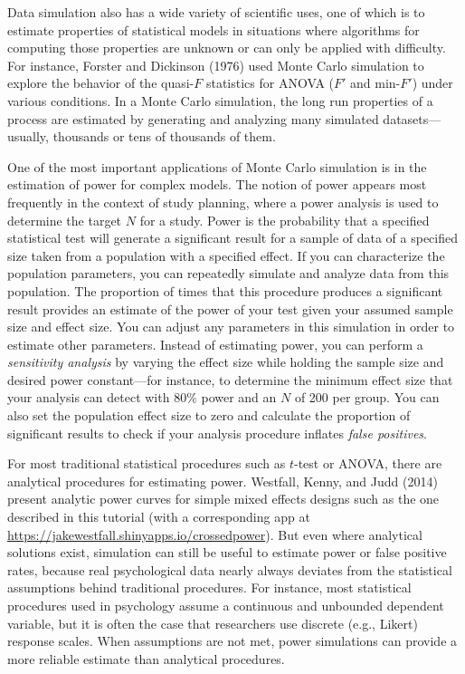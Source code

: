 \documentclass[
  english,
  doc,floatsintext]{apa6}
\begin{document}
Data simulation also has a wide variety of scientific uses, one of which is to estimate properties of statistical models in situations where algorithms for computing those properties are unknown or can only be applied with difficulty. For instance, Forster and Dickinson (1976) used Monte Carlo simulation to explore the behavior of the quasi-\(F\) statistics for ANOVA (\(F'\) and min-\(F'\)) under various conditions. In a Monte Carlo simulation, the long run properties of a process are estimated by generating and analyzing many simulated datasets---usually, thousands or tens of thousands of them.

One of the most important applications of Monte Carlo simulation is in the estimation of power for complex models. The notion of power appears most frequently in the context of study planning, where a power analysis is used to determine the target \(N\) for a study. Power is the probability that a specified statistical test will generate a significant result for a sample of data of a specified size taken from a population with a specified effect. If you can characterize the population parameters, you can repeatedly simulate and analyze data from this population. The proportion of times that this procedure produces a significant result provides an estimate of the power of your test given your assumed sample size and effect size. You can adjust any parameters in this simulation in order to estimate other parameters. Instead of estimating power, you can perform a \emph{sensitivity analysis} by varying the effect size while holding the sample size and desired power constant---for instance, to determine the minimum effect size that your analysis can detect with 80\% power and an \(N\) of 200 per group. You can also set the population effect size to zero and calculate the proportion of significant results to check if your analysis procedure inflates \emph{false positives}.

For most traditional statistical procedures such as \(t\)-test or ANOVA, there are analytical procedures for estimating power. Westfall, Kenny, and Judd (2014) present analytic power curves for simple mixed effects designs such as the one described in this tutorial (with a corresponding app at \url{https://jakewestfall.shinyapps.io/crossedpower}). But even where analytical solutions exist, simulation can still be useful to estimate power or false positive rates, because real psychological data nearly always deviates from the statistical assumptions behind traditional procedures. For instance, most statistical procedures used in psychology assume a continuous and unbounded dependent variable, but it is often the case that researchers use discrete (e.g., Likert) response scales. When assumptions are not met, power simulations can provide a more reliable estimate than analytical procedures.
\end{document}
